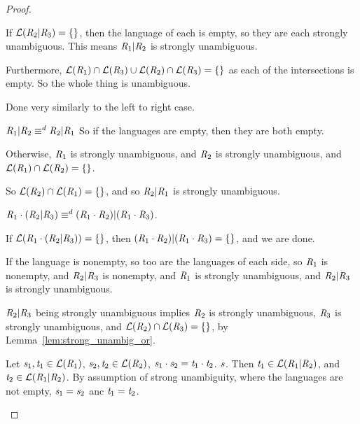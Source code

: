 \documentclass[numbers,10pt,preprint\ifanon ,nocopyrightspace\fi]{sigplanconf}
\begin{document}
\begin{proof}
\begin{case}
    If $\mathcal{L}(\mathit{R}_2 | \mathit{R}_3) = \{\}$, then the language of
    each is empty, so they are each strongly unambiguous.
    This means $\mathit{R}_1 | \mathit{R}_2$ is strongly unambiguous.

    Furthermore, $\mathcal{L}(\mathit{R}_1) \cap \mathcal{L}(\mathit{R}_3) \cup
    \mathcal{L}(\mathit{R}_2) \cap \mathcal{L}(\mathit{R}_3) = \{\}$ as each
    of the intersections is empty.  So the whole thing is unambiguous.
  \end{case}

  \begin{case}
    Done very similarly to the left to right case.
  \end{case}

  \begin{case}[\OrCommutativityRule{}]
    $\mathit{R}_1 | \mathit{R}_2 \equiv^d \mathit{R}_2 | \mathit{R}_1$
    So if the languages are empty, then they are both empty.

    Otherwise, $\mathit{R}_1$ is strongly unambiguous, and $\mathit{R}_2$ is strongly
    unambiguous, and $\mathcal{L}(\mathit{R}_1) \cap \mathcal{L}(\mathit{R}_2) =
    \{\}$.

    So $\mathcal{L}(\mathit{R}_2) \cap \mathcal{L}(\mathit{R}_1) = \{\}$, and
    so $\mathit{R}_2 | \mathit{R}_1$ is strongly unambiguous.
  \end{case}

  \begin{case}
    $\mathit{R}_1 \cdot (\mathit{R}_2 | \mathit{R}_3) \equiv^d
    (\mathit{R}_1 \cdot \mathit{R}_2) | (\mathit{R}_1 \cdot \mathit{R}_3)$.

    If $\mathcal{L}(\mathit{R}_1 \cdot (\mathit{R}_2 | \mathit{R}_3)) = \{\}$, then
    $(\mathit{R}_1 \cdot \mathit{R}_2) | (\mathit{R}_1 \cdot \mathit{R}_3) = \{\}$,
    and we are done.

    If the language is nonempty, so too are the languages of each side, so
    $\mathit{R}_1$ is nonempty, and $\mathit{R}_2 | \mathit{R}_3$ is nonempty,
    and $\mathit{R}_1$ is strongly unambiguous, and $\mathit{R}_2 | \mathit{R}_3$ is
    strongly unambiguous.

    $\mathit{R}_2 | \mathit{R}_3$ being strongly unambiguous implies $\mathit{R}_2$ is
    strongly unambiguous, $\mathit{R}_3$ is strongly unambiguous, and
    $\mathcal{L}(\mathit{R}_2) \cap \mathcal{L}(\mathit{R}_3) = \{\}$, by
    Lemma~\ref{lem:strong_unambig_or}.

    Let $\mathit{s}_1,\mathit{t}_1 \in \mathcal{L}(\mathit{R}_1)$,
    $\mathit{s}_2,\mathit{t}_2 \in \mathcal{L}(\mathit{R}_2)$,
    $\mathit{s}_1\cdot\mathit{s}_2 = \mathit{t}_1\cdot\mathit{t}_2$.
    $\mathit{s}$.  Then $\mathit{t}_1 \in \mathcal{L}(\mathit{R}_1 | \mathit{R}_2)$, and
    $\mathit{t}_2 \in \mathcal{L}(\mathit{R}_1 | \mathit{R}_2)$.
    By assumption of strong unambiguity, where the languages are not empty,
    $\mathit{s}_1  = \mathit{s}_2$ anc $\mathit{t}_1 = \mathit{t}_2$.


\end{case}
\end{proof}
\end{document}
